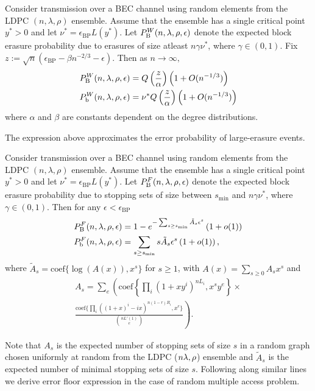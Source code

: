 \begin{lemma}
Consider transmission over a BEC channel using random elements from the LDPC $(n,\lambda,\rho)$ ensemble. Assume that the ensemble has a single critical point $y^*>0$ and let $\nu^*=\epsilon_{\text{BP}}L(y^*)$. Let $P_{\text{B}}^{W}(n,\lambda,\rho,\epsilon)$ denote the expected block erasure probability due to erasures of size atleast $n\gamma \nu^{*}$, where $\gamma\in (0,1)$. Fix $z:=\sqrt{n}(\epsilon_{\text{BP}}-\beta n^{-2/3}-\epsilon)$. Then as $n\rightarrow \infty ,$
\begin{align*}
P_{\text{B}}^{W}(n,\lambda,\rho,\epsilon)&=Q\left(\frac{z}{\alpha}\right)\left(1+O(n^{-1/3})\right)\\
P_{\text{b}}^{W}(n,\lambda,\rho,\epsilon)&=\nu^* Q\left(\frac{z}{\alpha}\right)\left(1+O(n^{-1/3})\right)
\end{align*}
where $\alpha$ and $\beta$ are constants dependent on the degree distributions.
\end{lemma}
The expression above approximates the error probability of large-erasure events.

\begin{lemma}
Consider transmission over a BEC channel using random elements from the LDPC $(n,\lambda,\rho)$ ensemble. Assume that the ensemble has a single critical point $y^*>0$ and let $\nu^*=\epsilon_{\text{BP}}L(y^*)$. Let $P_{\text{B}}^{F}(n,\lambda,\rho,\epsilon)$ denote the expected block erasure probability due to stopping sets of size between $s_{\text{min}}$ and  $n\gamma \nu^{*}$, where $\gamma\in (0,1)$. Then for any $\epsilon<\epsilon_{\text{BP}}$
\begin{align*}
P_{\text{B}}^{F}(n,\lambda,\rho,\epsilon)&=1-e^{-\sum_{s\geq s_{\min}}\tilde{A}_{s}\epsilon^s}\left(1+o(1)\right)\\
P_{\text{b}}^{F}(n,\lambda,\rho,\epsilon)&=\sum_{s\geq s_{\min}}s\tilde{A}_{s}\epsilon^s\left(1+o(1)\right),
\end{align*}
where $\tilde{A}_{s}=\text{coef}\{\log(A(x)),x^s\}$ for $s\geq 1$, with $A(x)=\sum_{s\geq 0} A_{s}x^s$ and
\begin{multline}
A_{s}=\sum_{e}\left( \text{coef}\left\lbrace\prod_{i} (1+xy^{i})^{nL_{i}}, x^{s}y^{e} \right\rbrace \right.\times \\
\left.\frac{\text{coef}\lbrace \prod_{i}\left((1+x)^i -ix \right)^{n(1-r)R_{i}},x^{e}\rbrace}{\binom{nL'(1)}{e}}\right).
\end{multline}
\end{lemma}
Note that $A_{s}$ is the expected number of stopping sets of size $s$ in a random graph chosen uniformly at random from the LDPC ($n\lambda,\rho$) ensemble and $\tilde{A}_{s}$ is the expected number of minimal stopping sets of size $s$. Following along similar lines we derive error floor expression in the case of random multiple access problem.
 
